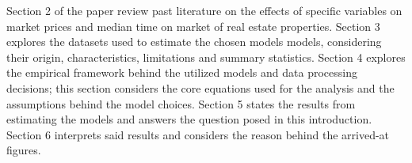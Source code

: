 Section 2 of the paper review past literature on the effects of specific variables on market prices and median time on market of real estate properties. Section 3 explores the datasets used to estimate the chosen models models, considering their origin, characteristics, limitations and summary statistics. Section 4 explores the empirical framework behind the utilized models and data processing decisions; this section considers the core equations used for the analysis and the assumptions behind the model choices. Section 5 states the results from estimating the models and answers the question posed in this introduction. Section 6 interprets said results and considers the reason behind the arrived-at figures. 
